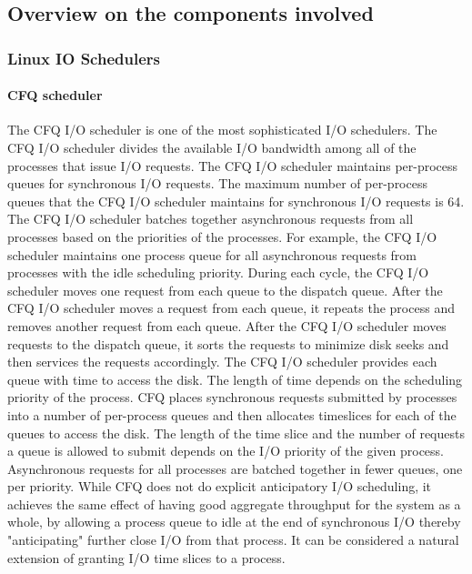 \documentclass{acmsig}
\begin{document}
\subsection{Overview on the components involved}
  \subsubsection{Linux IO Schedulers}

    \paragraph{CFQ scheduler}
    The CFQ I/O scheduler is one of the most sophisticated I/O schedulers. The CFQ I/O scheduler divides the available I/O bandwidth among all of the processes that issue I/O requests. The CFQ I/O scheduler maintains per-process queues for synchronous I/O requests. The maximum number of per-process queues that the CFQ I/O scheduler maintains for synchronous I/O requests is 64. The CFQ I/O scheduler batches together asynchronous requests from all processes based on the priorities of the processes. For example, the CFQ I/O scheduler maintains one process queue for all asynchronous requests from processes with the idle scheduling priority.
    During each cycle, the CFQ I/O scheduler moves one request from each queue to the dispatch queue. After the CFQ I/O scheduler moves a request from each queue, it repeats the process and removes another request from each queue. After the CFQ I/O scheduler moves requests to the dispatch queue, it sorts the requests to minimize disk seeks and then services the requests accordingly. The CFQ I/O scheduler provides each queue with time to access the disk. The length of time depends on the scheduling priority of the process.
    CFQ places synchronous requests submitted by processes into a number of per-process queues and then allocates timeslices for each of the queues to access the disk. The length of the time slice and the number of requests a queue is allowed to submit depends on the I/O priority of the given process. Asynchronous requests for all processes are batched together in fewer queues, one per priority. While CFQ does not do explicit anticipatory I/O scheduling, it achieves the same effect of having good aggregate throughput for the system as a whole, by allowing a process queue to idle at the end of synchronous I/O thereby "anticipating" further close I/O from that process. It can be considered a natural extension of granting I/O time slices to a process.
\end{document}
